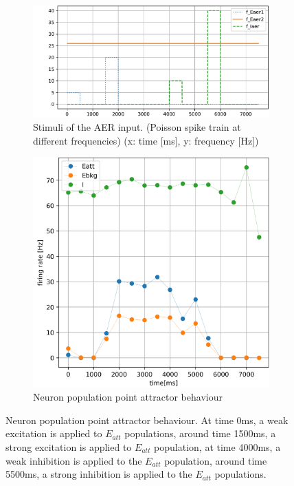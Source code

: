 \begin{figure}
	\begin{subfigure}{\textwidth}
		\centering
		\includegraphics[page=1, width=\columnwidth]{./img/behavior/input_stimuli.pdf}
		\caption{Stimuli of the AER input. (Poisson spike train at different frequencies) (x: time [ms], y: frequency [Hz])}
		\label{fig:spike_input2}
	\end{subfigure}
	\begin{subfigure}{\textwidth}
		\centering
		\includegraphics[width=\columnwidth]{./img/behavior/fr_time.pdf}
		\caption{Neuron population point attractor behaviour}
		\label{fig:neuron_state2}
	\end{subfigure}
	\caption{Neuron population point attractor behaviour. At time 0ms, a weak excitation is applied to $E_{att}$ populations, around time 1500ms, a strong excitation is applied to $E_{att}$ population, at time 4000ms, a weak inhibition is applied to the $E_{att}$ population, around time 5500ms, a strong inhibition is applied to the $E_{att}$ populations. }
	\label{fig:behavior2}
\end{figure}

